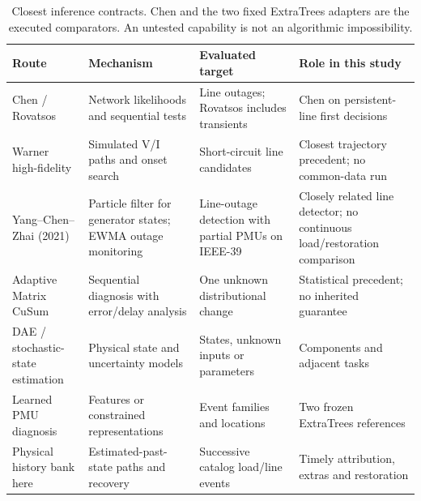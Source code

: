 \begin{table}[t]\centering\small
\caption{Closest inference contracts. Chen and the two fixed ExtraTrees
adapters are the executed comparators. An untested capability is not an
algorithmic impossibility.}
\label{tab:literature-capability}
\begin{tabularx}{\textwidth}{@{}lXXX@{}}\toprule
Route & Mechanism & Evaluated target & Role in this study\\\midrule
Chen / Rovatsos & Network likelihoods and sequential tests & Line outages; Rovatsos includes transients & Chen on persistent-line first decisions\\
Warner high-fidelity & Simulated V/I paths and onset search & Short-circuit line candidates & Closest trajectory precedent; no common-data run\\
Yang--Chen--Zhai (2021) & Particle filter for generator states; EWMA outage monitoring & Line-outage detection with partial PMUs on IEEE-39 & Closely related line detector; no continuous load/restoration comparison\\
Adaptive Matrix CuSum & Sequential diagnosis with error/delay analysis & One unknown distributional change & Statistical precedent; no inherited guarantee\\
DAE / stochastic-state estimation & Physical state and uncertainty models & States, unknown inputs or parameters & Components and adjacent tasks\\
Learned PMU diagnosis & Features or constrained representations & Event families and locations & Two frozen ExtraTrees references\\
Physical history bank here & Estimated-past-state paths and recovery & Successive catalog load/line events & Timely attribution, extras and restoration\\\bottomrule
\end{tabularx}\end{table}

